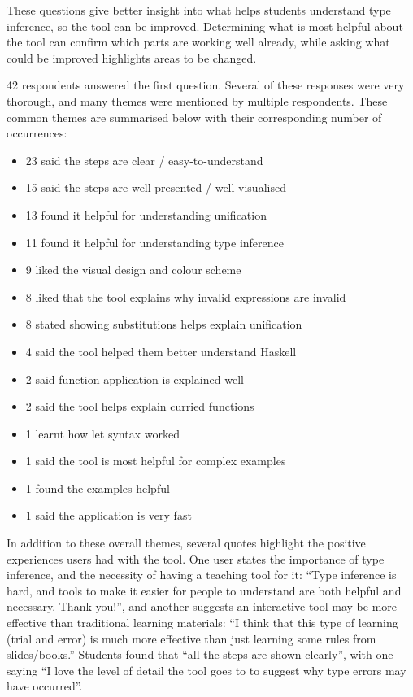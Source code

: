 \documentclass[a4paper,fleqn,12pt]{article}
\begin{document}
These questions give better insight into what helps students understand type inference, so the tool can be improved. Determining what is most helpful about the tool can confirm which parts are working well already, while asking what could be improved highlights areas to be changed.

42 respondents answered the first question. Several of these responses were very thorough, and many themes were mentioned by multiple respondents. These common themes are summarised below with their corresponding number of occurrences:
\begin{itemize}
  \item 23 said the steps are clear / easy-to-understand
  \item 15 said the steps are well-presented / well-visualised
  \item 13 found it helpful for understanding unification
  \item 11 found it helpful for understanding type inference
  \item 9 liked the visual design and colour scheme
  \item 8 liked that the tool explains why invalid expressions are invalid
  \item 8 stated showing substitutions helps explain unification
  \item 4 said the tool helped them better understand Haskell
  \item 2 said function application is explained well
  \item 2 said the tool helps explain curried functions
  \item 1 learnt how let syntax worked
  \item 1 said the tool is most helpful for complex examples
  \item 1 found the examples helpful
  \item 1 said the application is very fast
\end{itemize}

In addition to these overall themes, several quotes highlight the positive experiences users had with the tool. One user states the importance of type inference, and the necessity of having a teaching tool for it: “Type inference is hard, and tools to make it easier for people to understand are both helpful and necessary. Thank you!”, and another suggests an interactive tool may be more effective than traditional learning materials: “I think that this type of learning (trial and error) is much more effective than just learning some rules from slides/books.” Students found that “all the steps are shown clearly”, with one saying “I love the level of detail the tool goes to to suggest why type errors may have occurred”.
\end{document}

